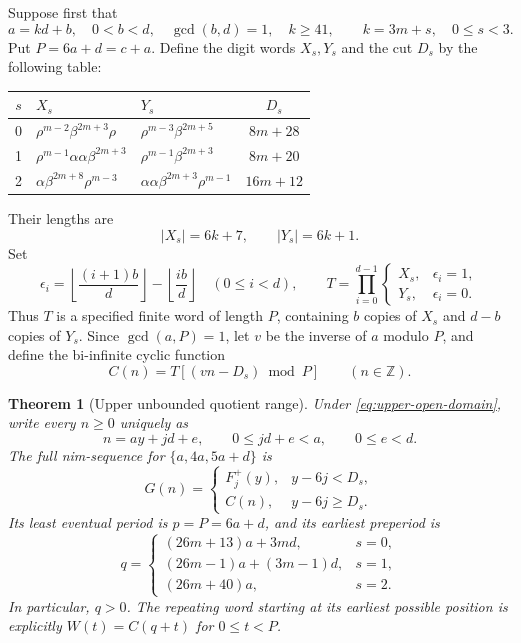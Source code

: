 \documentclass[11pt]{article}
\newtheorem{theorem}{Theorem}[section]
\theoremstyle{remark}\newtheorem{remark}[theorem]{Remark}
\begin{document}
Suppose first that
\begin{equation}\label{eq:upper-open-domain}
 a=kd+b,\quad 0<b<d,\quad \gcd(b,d)=1,\quad k\ge41,
 \qquad k=3m+s,\quad 0\le s<3.
\end{equation}
Put $P=6a+d=c+a$.  Define the digit words $X_s,Y_s$ and the cut $D_s$
by the following table:
\begin{center}\small
\begin{tabular}{cllc}\toprule
$s$&$X_s$&$Y_s$&$D_s$\\\midrule
0&$\rho^{m-2}\beta^{2m+3}\rho$
 &$\rho^{m-3}\beta^{2m+5}$&$8m+28$\\
1&$\rho^{m-1}\alpha\alpha\beta^{2m+3}$
 &$\rho^{m-1}\beta^{2m+3}$&$8m+20$\\
2&$\alpha\beta^{2m+8}\rho^{m-3}$
 &$\alpha\alpha\beta^{2m+3}\rho^{m-1}$&$16m+12$\\\bottomrule
\end{tabular}
\end{center}
Their lengths are
\begin{equation}\label{eq:upper-tower-lengths}
 |X_s|=6k+7,\qquad |Y_s|=6k+1.
\end{equation}
Set
\[
 \epsilon_i=\left\lfloor\frac{(i+1)b}{d}\right\rfloor
             -\left\lfloor\frac{ib}{d}\right\rfloor
 \quad(0\le i<d),
 \qquad
 T=\prod_{i=0}^{d-1}
 \begin{cases}X_s,&\epsilon_i=1,\\Y_s,&\epsilon_i=0.\end{cases}
\]
Thus $T$ is a specified finite word of length $P$, containing $b$ copies
of $X_s$ and $d-b$ copies of $Y_s$.  Since $\gcd(a,P)=1$, let $v$ be
the inverse of $a$ modulo $P$, and define the bi-infinite cyclic function
\begin{equation}\label{eq:upper-cycle}
 C(n)=T[(vn-D_s)\bmod P]\qquad(n\in\mathbb Z).
\end{equation}

\begin{theorem}[Upper unbounded quotient range]\label{thm:upper-near}
Under \eqref{eq:upper-open-domain}, write every $n\ge0$ uniquely as
\[
 n=ay+jd+e,\qquad 0\le jd+e<a,\qquad 0\le e<d.
\]
The full nim-sequence for $\{a,4a,5a+d\}$ is
\begin{equation}\label{eq:upper-full-word}
 G(n)=
 \begin{cases}
 F_j^+(y),&y-6j<D_s,\\
 C(n),&y-6j\ge D_s.
 \end{cases}
\end{equation}
Its least eventual period is $p=P=6a+d$, and its earliest preperiod is
\begin{equation}\label{eq:upper-q}
 q=
 \begin{cases}
 (26m+13)a+3md,&s=0,\\
 (26m-1)a+(3m-1)d,&s=1,\\
 (26m+40)a,&s=2.
 \end{cases}
\end{equation}
In particular, $q>0$.  The repeating word
starting at its earliest possible position is explicitly
$W(t)=C(q+t)$ for $0\le t<P$.
\end{theorem}
\end{document}
